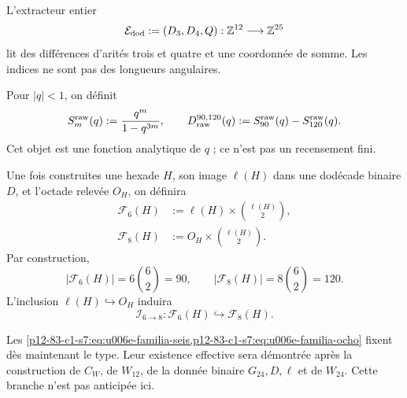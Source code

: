 {\begin{definition}
\label{p12-83-c1-s7:def:u006e-extractor-dodecafasico}
L’extracteur entier
\begin{equation}
 \mathcal E_{\rm dod}:=(D_3,D_4,Q):
 \mathbb Z^{12}\longrightarrow\mathbb Z^{25}
 \label{p12-83-c1-s7:eq:u006e-extractor-dodecafasico}
\end{equation}
lit des différences d’arités trois et quatre et une coordonnée de somme. Les
indices ne sont pas des longueurs angulaires.
\end{definition}

\begin{definition}
\label{p12-83-c1-s7:def:u006e-diferencia-cruda}
Pour \(|q|<1\), on définit
\begin{equation}
 S_m^{\rm raw}(q):=\frac{q^m}{1-q^{3m}},
 \qquad
 D_{\rm raw}^{90,120}(q)
 :=S_{90}^{\rm raw}(q)-S_{120}^{\rm raw}(q).
 \label{p12-83-c1-s7:eq:u006e-series-crudas}
\end{equation}
Cet objet est une fonction analytique de \(q\) ; ce n’est pas un recensement fini.
\end{definition}

\begin{definition}
\label{p12-83-c1-s7:def:u006e-familias-incidencia}
Une fois construites une hexade \(H\), son image
\(\ell(H)\) dans une dodécade binaire \(D\), et l’octade relevée
\(O_H\), on définira
\begin{align}
 \mathcal F_6(H)
 &:=\ell(H)\times\binom{\ell(H)}2,
 \label{p12-83-c1-s7:eq:u006e-familia-seis}\\
 \mathcal F_8(H)
 &:=O_H\times\binom{\ell(H)}2.
 \label{p12-83-c1-s7:eq:u006e-familia-ocho}
\end{align}
Par construction,
\begin{equation}
 |\mathcal F_6(H)|
 =6\binom62=90,
 \qquad
 |\mathcal F_8(H)|
 =8\binom62=120.
 \label{p12-83-c1-s7:eq:u006e-cardinales-incidencia}
\end{equation}
L’inclusion \(\ell(H)\hookrightarrow O_H\) induira
\begin{equation}
 \mathcal I_{6\to8}:
 \mathcal F_6(H)\hookrightarrow\mathcal F_8(H).
 \label{p12-83-c1-s7:eq:u006e-inclusion-incidencia}
\end{equation}
\end{definition}

Les \cref{p12-83-c1-s7:eq:u006e-familia-seis,p12-83-c1-s7:eq:u006e-familia-ocho} fixent dès maintenant le
type. Leur existence effective sera démontrée après la construction de
\(C_W\), de \(W_{12}\), de la donnée binaire \(G_{24},D,\ell\) et de \(W_{24}\).
Cette branche n’est pas anticipée ici.

}
